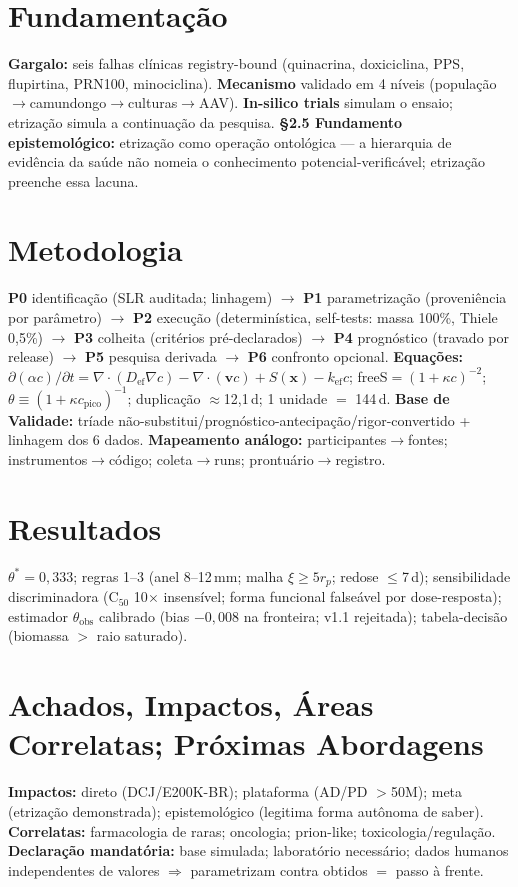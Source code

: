 \documentclass[10pt,twocolumn]{article}
\begin{document}
\section{Fundamentação}
\textbf{Gargalo:} seis falhas clínicas registry-bound (quinacrina, doxiciclina, PPS, flupirtina, PRN100, minociclina). \textbf{Mecanismo} validado em 4 níveis (população$\to$camundongo$\to$culturas$\to$AAV). \textbf{In-silico trials} simulam o ensaio; etrização simula a continuação da pesquisa. \textbf{\S2.5 Fundamento epistemológico:} etrização como operação ontológica --- a hierarquia de evidência da saúde não nomeia o conhecimento potencial-verificável; etrização preenche essa lacuna.

\section{Metodologia}
\textbf{P0} identificação (SLR auditada; linhagem) $\to$ \textbf{P1} parametrização (proveniência por parâmetro) $\to$ \textbf{P2} execução (determinística, self-tests: massa 100\%, Thiele 0,5\%) $\to$ \textbf{P3} colheita (critérios pré-declarados) $\to$ \textbf{P4} prognóstico (travado por release) $\to$ \textbf{P5} pesquisa derivada $\to$ \textbf{P6} confronto opcional.
\textbf{Equações:} $\partial(\alpha c)/\partial t = \nabla \cdot (D_{\text{ef}} \nabla c) - \nabla \cdot (\mathbf{v}c) + S(\mathbf{x}) - k_{\text{ef}}c$; freeS$=(1+\kappa c)^{-2}$; $\theta \equiv (1+\kappa c_{\text{pico}})^{-1}$; duplicação $\approx$12,1\,d; 1 unidade $=$ 144\,d.
\textbf{Base de Validade:} tríade não-substitui/prognóstico-antecipação/rigor-convertido + linhagem dos 6 dados.
\textbf{Mapeamento análogo:} participantes$\to$fontes; instrumentos$\to$código; coleta$\to$runs; prontuário$\to$registro.

\section{Resultados}
$\theta^{*}{=}0{,}333$; regras 1--3 (anel 8--12\,mm; malha $\xi\ge5r_p$; redose $\le$7\,d); sensibilidade discriminadora (C$_{50}$ 10$\times$ insensível; forma funcional falseável por dose-resposta); estimador $\theta_{\text{obs}}$ calibrado (bias $-0{,}008$ na fronteira; v1.1 rejeitada); tabela-decisão (biomassa $>$ raio saturado).

\section{Achados, Impactos, Áreas Correlatas; Próximas Abordagens}
\textbf{Impactos:} direto (DCJ/E200K-BR); plataforma (AD/PD $>$50M); meta (etrização demonstrada); epistemológico (legitima forma autônoma de saber). \textbf{Correlatas:} farmacologia de raras; oncologia; prion-like; toxicologia/regulação. \textbf{Declaração mandatória:} base simulada; laboratório necessário; dados humanos independentes de valores $\Rightarrow$ parametrizam contra obtidos $=$ passo à frente.
\end{document}
